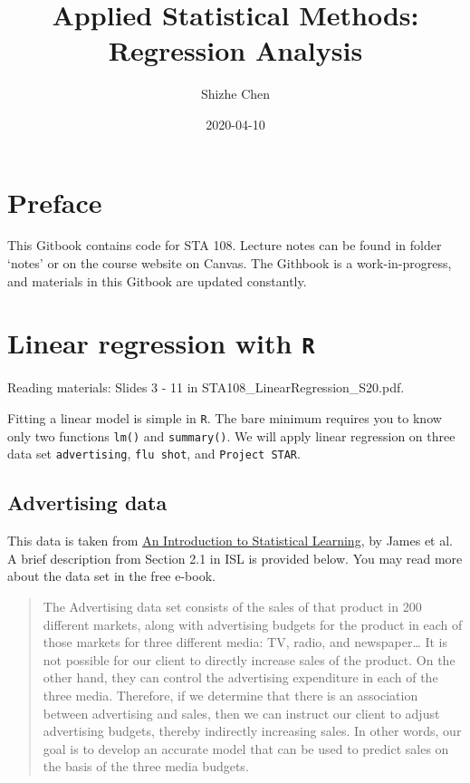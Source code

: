 \documentclass[12pt,]{book}
\title{Applied Statistical Methods: Regression Analysis}
\author{Shizhe Chen}
\date{2020-04-10}
\begin{document}
\maketitle

{
\setcounter{tocdepth}{1}
\tableofcontents
}
\chapter*{Preface}\label{pre}

This Gitbook contains code for STA 108. Lecture notes can be found in
folder `notes' or on the course website on Canvas. The Githbook is a
work-in-progress, and materials in this Gitbook are updated constantly.

\chapter{\texorpdfstring{Linear regression with
\texttt{R}}{Linear regression with R}}\label{ch:lmR}

Reading materials: Slides 3 - 11 in STA108\_LinearRegression\_S20.pdf.

Fitting a linear model is simple in \texttt{R}. The bare minimum
requires you to know only two functions \texttt{lm()} and
\texttt{summary()}. We will apply linear regression on three data set
\texttt{advertising}, \texttt{flu\ shot}, and \texttt{Project\ STAR}.

\section{Advertising data}\label{advertising-data}

This data is taken from
\href{http://faculty.marshall.usc.edu/gareth-james/ISL/}{An Introduction
to Statistical Learning}, by James et al. A brief description from
Section 2.1 in ISL is provided below. You may read more about the data
set in the free e-book.

\begin{quote}
The Advertising data set consists of the sales of that product in 200
different markets, along with advertising budgets for the product in
each of those markets for three different media: TV, radio, and
newspaper\ldots{} It is not possible for our client to directly increase
sales of the product. On the other hand, they can control the
advertising expenditure in each of the three media. Therefore, if we
determine that there is an association between advertising and sales,
then we can instruct our client to adjust advertising budgets, thereby
indirectly increasing sales. In other words, our goal is to develop an
accurate model that can be used to predict sales on the basis of the
three media budgets.
\end{quote}
\end{document}

